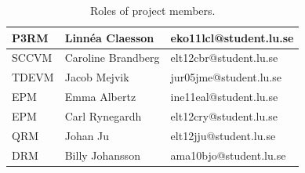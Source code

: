 \documentclass[10pt,a4paper]{article}
\begin{document}
\begin{table}[h!]
\centering
\caption{Roles of project members.}
\label{table:roles}
\begin{tabular}{|l|l|l|} \hline
P3RM & Linnéa Claesson & eko11lcl@student.lu.se\\ \hline
SCCVM & Caroline Brandberg & elt12cbr@student.lu.se\\ \hline
TDEVM & Jacob Mejvik & jur05jme@student.lu.se\\ \hline
EPM & Emma Albertz & ine11eal@student.lu.se\\ \hline
EPM & Carl Rynegardh & elt12cry@student.lu.se\\ \hline
QRM & Johan Ju & elt12jju@student.lu.se\\ \hline
DRM & Billy Johansson & ama10bjo@student.lu.se\\ \hline

\end{tabular}\\
\end{table}
\end{document}
